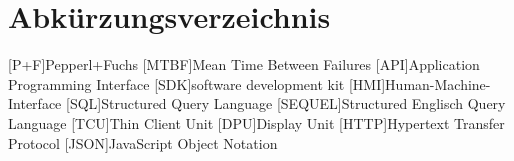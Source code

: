 
\chapter*{Abkürzungsverzeichnis}
\begin{acronym}[slmtA]
    [P+F]{Pepperl+Fuchs}
    [MTBF]{Mean Time Between Failures}
    [API]{Application Programming Interface}
    [SDK]{software development kit}
    [HMI]{Human-Machine-Interface }
    [SQL]{Structured Query Language}
    [SEQUEL]{Structured Englisch Query Language}
    [TCU]{Thin Client Unit}
    [DPU]{Display Unit}
    [HTTP]{Hypertext Transfer Protocol}
    [JSON]{JavaScript Object Notation}
\end{acronym}
